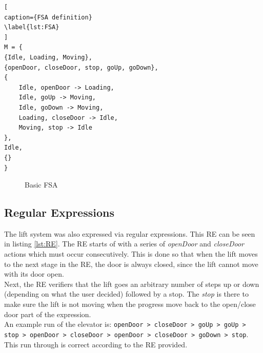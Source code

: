 \documentclass[a4paper, 12pt]{article}
\begin{document}
\begin{lstlisting}[
caption={FSA definition}
\label{lst:FSA}
]
M = {
{Idle, Loading, Moving},
{openDoor, closeDoor, stop, goUp, goDown},
{
    Idle, openDoor -> Loading,
    Idle, goUp -> Moving,
    Idle, goDown -> Moving,
    Loading, closeDoor -> Idle,
    Moving, stop -> Idle
},
Idle,
{}
}
\end{lstlisting}





\begin{figure}[h] %
    \centering %
    \caption{Basic FSA}
    \label{fig:FSA}
\end{figure}


\subsection{Regular Expressions}
The lift system was also expressed via regular expressions. This RE can be seen in listing \ref{lst:RE}. The RE starts of with a series of \textit{openDoor} and \textit{closeDoor} actions which must occur consecutively. This is done so that when the lift moves to the next stage in the RE, the door is always closed, since the lift cannot move with its door open. \\

Next, the RE verifiers that the lift goes an arbitrary number of steps up or down (depending on what the user decided) followed by a stop. The \textit{stop} is there to make sure the lift is not moving when the progress move back to the open/close door part of the expression. \\

An example run of the elevator is:
\texttt{openDoor > closeDoor > goUp > goUp > stop > openDoor > closeDoor > openDoor > closeDoor > goDown > stop}.
This run through is correct according to the RE provided. 
\end{document}
